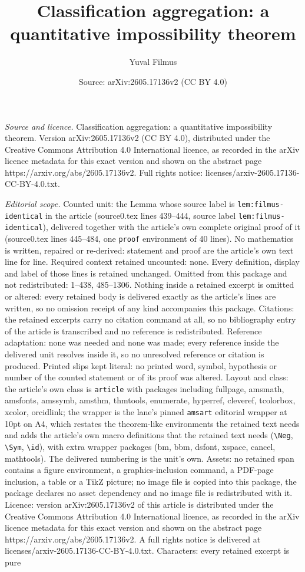 \documentclass[10pt,a4paper]{amsart}
\title[Classification aggregation: a quantitative impossibility the]{Classification aggregation: a quantitative impossibility theorem}
\author{Yuval Filmus}
\date{Source: arXiv:2605.17136v2 (CC BY 4.0)}
\begin{document}
\maketitle

\noindent\emph{Source and licence.} Classification aggregation: a quantitative impossibility theorem. Version arXiv:2605.17136v2 (CC BY 4.0), distributed under the Creative Commons Attribution 4.0 International licence, as recorded in the arXiv licence metadata for this exact version and shown on the abstract page https://arxiv.org/abs/2605.17136v2. Full rights notice: licenses/arxiv-2605.17136-CC-BY-4.0.txt.\par\smallskip

\noindent\textit{Editorial scope.} Counted unit: the Lemma whose source label is \texttt{lem:filmus-identical} in the article (source0.tex lines 439--444, source label \texttt{lem:filmus-identical}), delivered together with the article's own complete original proof of it (source0.tex lines 445--484, one \texttt{proof} environment of 40 lines). No mathematics is written, repaired or re-derived: statement and proof are the article's own text line for line. Required context retained uncounted: none. Every definition, display and label of those lines is retained unchanged. Omitted from this package and not redistributed: 1--438, 485--1306. Nothing inside a retained excerpt is omitted or altered: every retained body is delivered exactly as the article's lines are written, so no omission receipt of any kind accompanies this package. Citations: the retained excerpts carry no citation command at all, so no bibliography entry of the article is transcribed and no reference is redistributed. Reference adaptation: none was needed and none was made; every reference inside the delivered unit resolves inside it, so no unresolved reference or citation is produced. Printed slips kept literal: no printed word, symbol, hypothesis or number of the counted statement or of its proof was altered. Layout and class: the article's own class is \texttt{article} with packages including fullpage, amsmath, amsfonts, amssymb, amsthm, thmtools, enumerate, hyperref, cleveref, tcolorbox, xcolor, orcidlink; the wrapper is the lane's pinned \texttt{amsart} editorial wrapper at 10pt on A4, which restates the theorem-like environments the retained text needs and adds the article's own macro definitions that the retained text needs (\texttt{\textbackslash Neg}, \texttt{\textbackslash Sym}, \texttt{\textbackslash id}), with extra wrapper packages (bm, bbm, dsfont, xspace, cancel, mathtools). The delivered numbering is the unit's own. Assets: no retained span contains a figure environment, a graphics-inclusion command, a PDF-page inclusion, a table or a TikZ picture; no image file is copied into this package, the package declares no asset dependency and no image file is redistributed with it. Licence: version arXiv:2605.17136v2 of this article is distributed under the Creative Commons Attribution 4.0 International licence, as recorded in the arXiv licence metadata for this exact version and shown on the abstract page https://arxiv.org/abs/2605.17136v2. A full rights notice is delivered at licenses/arxiv-2605.17136-CC-BY-4.0.txt. Characters: every retained excerpt is pure 
\end{document}
